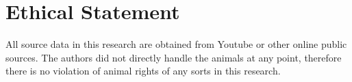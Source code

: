 \section*{Ethical Statement}
\label{sec:ethics}
All source data in this research are obtained from Youtube or other online public sources.
The authors did not directly handle the animals at any point, therefore there is no 
violation of animal rights of any sorts in this research.
